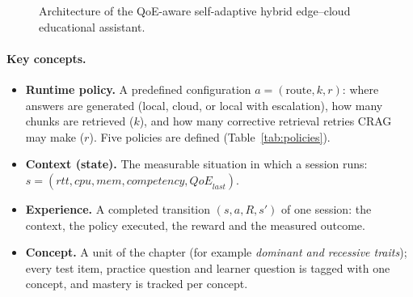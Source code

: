 \begin{figure}[htbp]
\caption{Architecture of the QoE-aware self-adaptive hybrid edge--cloud educational assistant.}
\label{fig:architecture}
\end{figure}

\paragraph{Key concepts.}
\begin{itemize}
  \item \textbf{Runtime policy.} A predefined configuration $a = (\text{route}, k, r)$: where answers are generated
        (local, cloud, or local with escalation), how many chunks are retrieved ($k$), and how many corrective
        retrieval retries CRAG may make ($r$). Five policies are defined (Table~\ref{tab:policies}).
  \item \textbf{Context (state).} The measurable situation in which a session runs:
        $s = (\mathit{rtt}, \mathit{cpu}, \mathit{mem}, \mathit{competency}, \mathit{QoE}_{\mathit{last}})$.
  \item \textbf{Experience.} A completed transition $(s, a, R, s')$ of one session: the context, the policy executed,
        the reward and the measured outcome.
  \item \textbf{Concept.} A unit of the chapter (for example \emph{dominant and recessive traits}); every test item,
        practice question and learner question is tagged with one concept, and mastery is tracked per concept.
\end{itemize}

